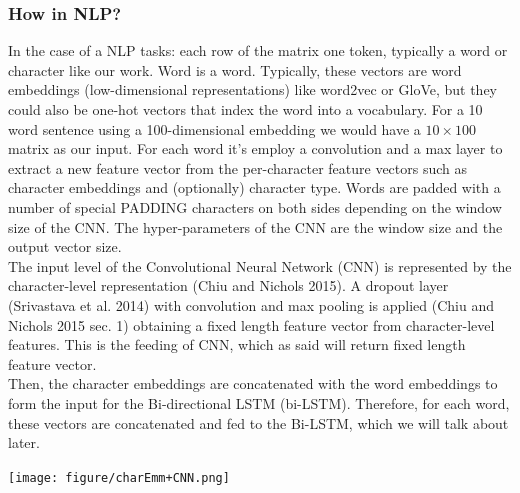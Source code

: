 \documentclass[twocolumn,10pt]{wmrDoc}
\begin{document}
\subsubsection{How in NLP?}

In the case of a NLP tasks: each row of the matrix one token, typically a word or character like our work. Word is a word. Typically, these vectors are word embeddings (low-dimensional representations) like word2vec or GloVe, but they could also be one-hot vectors that index the word into a vocabulary. For a 10 word sentence using a 100-dimensional embedding we would have a $10 × 100$ matrix as our input.
For each word it's employ a convolution and a max layer to extract a new feature vector from the per-character feature vectors such as character embeddings and (optionally) character type.  Words are padded with a number of special PADDING characters on both sides depending on the window size of the CNN.
The hyper-parameters of the CNN are the window size and the output vector size.\\
The input level of the Convolutional Neural Network (CNN) is represented by the character-level representation \cite{DBLP:journals/corr/ChiuN15}(Chiu and Nichols 2015). A dropout layer \cite{DBLP:journals/jmlr/SrivastavaHKSS14}(Srivastava et al. 2014) with convolution and max pooling is applied \cite{DBLP:journals/corr/ChiuN15}(Chiu and Nichols 2015 sec. 1) obtaining a fixed length feature vector from character-level features. This is the feeding of CNN, which as said will return fixed length feature vector.\\
Then, the character embeddings are concatenated with the word embeddings to form the input for the Bi-directional LSTM (bi-LSTM).
Therefore, for each word, these vectors are concatenated and fed to the Bi-LSTM,
which we will talk about later.

\texttt{[image: figure/charEmm+CNN.png]}
\end{document}
